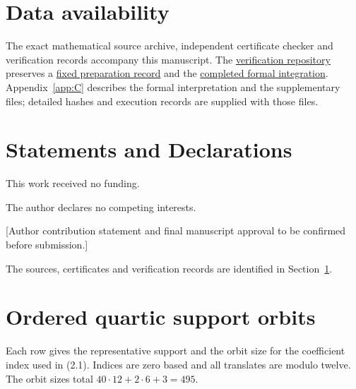 \documentclass[pdflatex,sn-mathphys-num]{sn-jnl}
\begin{document}
\section{Data availability}\label{sec:7}

The exact mathematical source archive, independent certificate checker and verification records accompany this manuscript. The \href{https://github.com/contatofilipevono-rgb/hrsbf-bent-verification}{verification repository} preserves a \href{https://github.com/contatofilipevono-rgb/hrsbf-bent-verification/tree/1e0e052/research_updates/2026_10_21_preprint}{fixed preparation record} and the \href{https://github.com/contatofilipevono-rgb/hrsbf-bent-verification/tree/9be0d98/research_updates/2026_10_20_final_integration}{completed formal integration}. Appendix~\ref{app:C} describes the formal interpretation and the supplementary files; detailed hashes and execution records are supplied with those files.

\section*{Statements and Declarations}

 This work received no funding.

 The author declares no competing interests.

 [Author contribution statement and final manuscript approval to be confirmed before submission.]

 The sources, certificates and verification records are identified in Section~\ref{sec:7}.

\appendix
\section{Ordered quartic support orbits}\label{app:A}

Each row gives the representative support and the orbit size for the coefficient index used in (2.1). Indices are zero based and all translates are modulo twelve. The orbit sizes total $40\cdot12+2\cdot6+3=495$.
\end{document}
